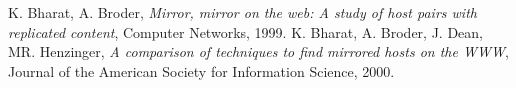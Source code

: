 \begin{thebibliography}{50}
 K. Bharat, A. Broder, \textsl{Mirror, mirror on the web: A study of host pairs with replicated content}, Computer Networks, 1999.
 K. Bharat, A. Broder, J. Dean, MR. Henzinger, \textsl{A comparison of techniques to find mirrored hosts on the WWW}, Journal of the American Society for Information Science, 2000.
\end{thebibliography}